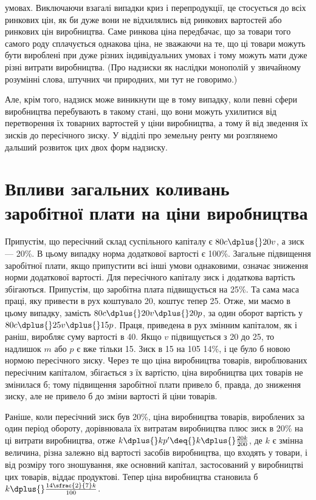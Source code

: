 \parcont{}  %
умовах. Виключаючи взагалі випадки криз і перепродукції, це
стосується до всіх ринкових цін, як би дуже вони не відхилялись
від ринкових вартостей або ринкових цін виробництва.
Саме ринкова ціна передбачає, що за товари того самого роду
сплачується однакова ціна, не зважаючи на те, що ці товари
можуть бути вироблені при дуже різних індивідуальних умовах
і тому можуть мати дуже різні витрати виробництва. (Про надзиски
як наслідки монополій у звичайному розумінні слова, штучних
чи природних, ми тут не говоримо.)

Але, крім того, надзиск може виникнути ще в тому випадку,
коли певні сфери виробництва перебувають в такому стані, що
вони можуть ухилитися від перетворення їх товарних вартостей
у ціни виробництва, а тому й від зведення їх зисків до пересічного
зиску. У відділі про земельну ренту ми розглянемо
дальший розвиток цих двох форм надзиску.

\section{Впливи загальних коливань заробітної плати
на ціни виробництва}
%

Припустім, що пересічний склад суспільного капіталу є
$80 c \dplus{} 20 v$, а зиск — 20\%. В цьому випадку норма додаткової
вартості є 100\%. Загальне підвищення заробітної плати, якщо
припустити всі інші умови однаковими, означає зниження норми
додаткової вартості. Для пересічного капіталу зиск і додаткова
вартість збігаються. Припустім, що заробітна плата підвищується
на 25\%. Та сама маса праці, яку привести в рух коштувало 20,
коштує тепер 25. Отже, ми маємо в цьому випадку, замість
$80 c \dplus{} 20 v \dplus{} 20 p$, за один оборот вартість у $80 c \dplus{} 25 v \dplus{} 15 p$.
Праця, приведена в рух змінним капіталом, як і раніш, виробляє
суму вартості в 40. Якщо $v$ підвищується з 20 до 25, то надлишок
$m$ або $p$ є вже тільки \deq{} 15. Зиск в 15 на 105 \deq{} 14\%,
і це було б новою нормою пересічного зиску. Через те що
ціна виробництва товарів, вироблюваних пересічним капіталом,
збігається з їх вартістю, ціна виробництва цих товарів не змінилася
б; тому підвищення заробітної плати привело б, правда,
до зниження зиску, але не привело б до зміни вартості й ціни
товарів.

Раніше, коли пересічний зиск був \deq{} 20\%, ціна виробництва
товарів, вироблених за один період обороту, дорівнювала їх
витратам виробництва плюс зиск в 20\% на ці витрати виробництва,
отже \deq{} $k \dplus{} kp' \deq{} k \dplus{} \frac{20k}{200}$, де $k$ є змінна величина, різна
залежно від вартості засобів виробництва, що входять у товари,
і від розміру того зношування, яке основний капітал, застосований
у виробництві цих товарів, віддає продуктові. Тепер
ціна виробництва становила б $k \dplus{} \frac{14\sfrac{2}{7} k }{100}$.
